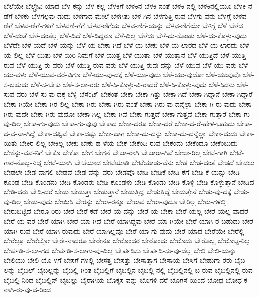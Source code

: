 {ಬೆಲೆಯೇ
ಬೆಲ್ಗ್ರೇವಿ-ಯಾದ
ಬೆಳ-ಕನ್ನು
ಬೆಳ-ಕಲ್ಲ
ಬೆಳಕಿಗೆ
ಬೆಳಕಿನ
ಬೆಳಕಿ-ನಂತೆ
ಬೆಳಕಿ-ನಲ್ಲಿ
ಬೆಳಕಿನಲ್ಲಿಯೂ
ಬೆಳಕಿ-ನೆ-ಡೆಗೆ
ಬೆಳಕು
ಬೆಳಗಲ್ಪವು-ಡುದು
ಬೆಳಗಾದ-ಮೇಲೆ
ಬೆಳಗಿತು
ಬೆಳ-ಗಿನ
ಬೆಳಗುತ್ತಿ-ರುವ
ಬೆಳಗು-ವನು
ಬೆಳಗ್ಗೆ
ಬೆಳವ-ಣಿಗೆ
ಬೆಳವ-ಣಿಗೆ-ಗಳಿಗೆ
ಬೆಳವಣಿ-ಗೆಗೆ
ಬೆಳವ-ಣಿಗೆಯ
ಬೆಳವ-ಣಿಗೆ-ಯನ್ನು
ಬೆಳವ-ಣಿಗೆಯೇ
ಬೆಳಿಗ್ಗೆ
ಬೆಳೆ
ಬೆಳೆದ
ಬೆಳೆ-ದಂತೆ
ಬೆಳೆ-ದಂತೆಲ್ಲ
ಬೆಳೆ-ದಿದೆ
ಬೆಳೆ-ದಿದ್ದರೂ
ಬೆಳೆ-ದಿಲ್ಲ
ಬೆಳೆದು
ಬೆಳೆ-ದು-ಕೊಂಡು
ಬೆಳೆ-ದು-ಕೊಳ್ಳು-ವುದು
ಬೆಳೆದೇ
ಬೆಳೆ-ಯದೆ
ಬೆಳೆ-ಯನ್ನು
ಬೆಳೆ-ಯ-ಬೇಕಾ-ಗಿದೆ
ಬೆಳೆ-ಯ-ಬೇಕು
ಬೆಳೆ-ಯ-ಲಾರದ
ಬೆಳೆ-ಯ-ಲಾರದು
ಬೆಳೆ-ಯ-ಲಿಲ್ಲ
ಬೆಳೆ-ಯಿತು
ಬೆಳೆ-ಯಿರಿ-ನಿಮಗೆ
ಬೆಳೆ-ಯುತ್ತ
ಬೆಳೆ-ಯುತ್ತಾ
ಬೆಳೆ-ಯುತ್ತಾನೆ
ಬೆಳೆ-ಯುತ್ತಿದೆ
ಬೆಳೆ-ಯುತ್ತಿ-ರುವ
ಬೆಳೆ-ಯುತ್ತಿ-ರು-ವರು
ಬೆಳೆ-ಯುತ್ತಿ-ರುವ-ವರು
ಬೆಳೆ-ಯುತ್ತಿ-ರುವು-ದನ್ನು
ಬೆಳೆ-ಯುವ
ಬೆಳೆ-ಯು-ವರು
ಬೆಳೆ-ಯು-ವಳು
ಬೆಳೆ-ಯುವ-ವರೆ-ವಿಗೂ
ಬೆಳೆ-ಯು-ವು-ದಕ್ಕೆ
ಬೆಳೆ-ಯು-ವುದು
ಬೆಳೆ-ಯು-ವುದೋ
ಬೆಳೆ-ಯುವುವೊ
ಬೆಳೆ-ಸ-ಬಹುದು
ಬೆಳೆ-ಸ-ಬೇಕು
ಬೆಳೆ-ಸ-ಲಾ-ರರು
ಬೆಳೆ-ಸಿ-ಕೊಳ್ಳು-ವಿ-ರಾದರೆ
ಬೆಳೆ-ಸಿ-ಕೊಳ್ಳು-ವುದು
ಬೆಳೆ-ಸಿದನು
ಬೆಳೆ-ಸುವ-ವರು
ಬೆಳೆ-ಸು-ವು-ದಕ್ಕೆ
ಬೆಳ್ಳಿ
ಬೆಸೆಂಟ್
ಬೇಕಂತೆ
ಬೇಕಾ
ಬೇಕಾ-ಗಿತ್ತು
ಬೇಕಾ-ಗಿದೆ
ಬೇಕಾ-ಗಿದ್ದಾನೆ
ಬೇಕಾ-ಗಿದ್ದಾರೆ
ಬೇಕಾ-ಗಿಯೇ
ಬೇಕಾ-ಗಿರ-ಲಿಲ್ಲ
ಬೇಕಾ-ಗಿರು
ಬೇಕಾ-ಗಿರು-ವಂತೆ
ಬೇಕಾ-ಗಿರು-ವು-ದನ್ನೆಲ್ಲಾ
ಬೇಕಾ-ಗಿ-ರು-ವುದು
ಬೇಕಾ-ಗಿರು-ವುದೇ
ಬೇಕಾ-ಗಿರು-ವುದೋ
ಬೇಕಾ-ಗಿಲ್ಲ
ಬೇಕಾ-ಗಿವೆ
ಬೇಕಾ-ಗುತ್ತದೆ
ಬೇಕಾ-ಗುತ್ತವೆ
ಬೇಕಾ-ಗುತ್ತಾರೆ
ಬೇಕಾ-ಗು-ವು-ದಿಲ್ಲ
ಬೇಕಾ-ಗು-ವುದು
ಬೇಕಾ-ಗು-ವುವು
ಬೇಕಾದ
ಬೇಕಾ-ದರೂ
ಬೇಕಾ-ದರೆ
ಬೇಕಾ-ದ-ರೆ-ಹೇಳ-ಬಹುದು
ಬೇಕಾ-ದ-ವ-ನಾ-ಗಿದ್ದೆ
ಬೇಕಾ-ದಷ್ಟಿವೆ
ಬೇಕಾ-ದಷ್ಟು
ಬೇಕಾ-ದಾಗ
ಬೇಕಾ-ದು-ದನ್ನು
ಬೇಕಾ-ದು-ದನ್ನೆಲ್ಲಾ
ಬೇಕಾ-ದುದು
ಬೇಕಾ-ಯಿತು
ಬೇಕಿರ-ಲಿಲ್ಲ
ಬೇಕಿಲ್ಲ
ಬೇಕು
ಬೇಕು-ಹ-ಳೆಯ
ಬೇಕೆ
ಬೇಕೆಂದಿ-ರುವ
ಬೇಕೆಂದು
ಬೇಕೆಂದೂ
ಬೇಕೆಂಬುದು
ಬೇಕೆನ್ನು-ವವ-ನಿಗೆ
ಬೇಕೊ
ಬೇಕೋ
ಬೇಗ
ಬೇಗನೆ
ಬೇಜಾ-ರಾಗಿ
ಬೇಜಾರಾ-ಗಿವೆ
ಬೇಜಾ-ರಿಲ್ಲ
ಬೇಟೆ-ಗಾಗಿ
ಬೇಟೆ-ಗಾರ-ನೊಬ್ಬ-ನಿದ್ದ
ಬೇಟೆ-ಯಾಗಿ
ಬೇಟೆಯಾಡ
ಬೇಟೆಯಾಡಿ
ಬೇಟೆಯಾಡು-ವೆನು
ಬೇಡ
ಬೇಡ-ದಂತೆ
ಬೇಡದೆ
ಬೇಡಲು
ಬೇಡಲೇ
ಬೇಡ-ವಾಗಲಿ
ಬೇಡವೆ
ಬೇಡ-ವೆನ್ನು-ವರು
ಬೇಡವೊ
ಬೇಡಿ
ಬೇಡಿಕೆ
ಬೇಡಿ-ಕೆಗೆ
ಬೇಡಿ-ಕೆ-ಯನ್ನು
ಬೇಡಿ-ಕೊಂಡ
ಬೇಡಿ-ಕೊಂಡನು
ಬೇಡಿ-ಕೊಂಡರು
ಬೇಡಿ-ಕೊಂಡಳು
ಬೇಡಿ-ಕೊಂಡು
ಬೇಡಿ-ಕೊಳ್ಳಿ
ಬೇಡಿ-ಕೊಳ್ಳುತ್ತಾನೆ
ಬೇಡಿದ
ಬೇಡಿ-ದರು
ಬೇಡಿ-ದರೆ
ಬೇಡು
ಬೇಡುತ್ತಾ
ಬೇಡುತ್ತಾನೆ
ಬೇಡುತ್ತಿದ್ದ
ಬೇಡುತ್ತಿದ್ದೆ
ಬೇಡುತ್ತೇನೆ
ಬೇಡು-ವು-ದಕ್ಕೆ
ಬೇಡು-ವು-ದಿಲ್ಲ
ಬೇಡು-ವುದು
ಬೇಯಿಸಿ
ಬೇರನ್ನು
ಬೇರಾ-ರನ್ನೂ
ಬೇರಾವ
ಬೇರಾ-ವುದೂ
ಬೇರಿಲ್ಲ
ಬೇರು-ಗಳಲ್ಲಿ
ಬೇರುಬಿಟ್ಟಿದೆ
ಬೇರೂ-ರಿರು
ಬೇರೆ
ಬೇರೆ-ಕಡೆ
ಬೇರೆ-ಯ-ದನ್ನು
ಬೇರೆ-ಯ-ಬೇಕಾ
ಬೇರೆ-ಯಲ್ಲ
ಬೇರೆ-ಯಲ್ಲ-ವಾದರೆ
ಬೇರೆ-ಯ-ವರ
ಬೇರೆ-ಯಾಗಿ
ಬೇರೆ-ಯಾ-ಗಿದೆ
ಬೇರೆ-ಯಾಗಿದ್ದವು
ಬೇರೆ-ಯಾ-ಗಿಯೇ
ಬೇರೆ-ಯಾಗಿ-ರ-ಬಹುದು
ಬೇರೆ-ಯಾಗಿ-ರುವ
ಬೇರೆ-ಯಾಗಿ-ರುವುದು
ಬೇರೆ-ಯಾಗಿಲ್ಲವೊ
ಬೇರೆ-ಯಾ-ಗು-ವುದು
ಬೇರೆ-ಯಾದ
ಬೇರೆಯೇ
ಬೇರೆಲ್ಲಿ
ಬೇರೆಲ್ಲೂ
ಬೇರೆಲ್ಲೋ
ಬೇರೇ-ನಾದರೂ
ಬೇರೇನೂ
ಬೇರೊಂದರ
ಬೇರೊಂದು
ಬೇರೊದು
ಬೇರೊಬ್ಬ
ಬೇರೊಬ್ಬ-ರಿಲ್ಲ
ಬೇರ್ಪಡಿ-ಸ-ಲಾ-ಗದ
ಬೇರ್ಪಡಿ-ಸ-ಲಾಗು-ವು-ದಿಲ್ಲ
ಬೇರ್ಪಡಿಸು
ಬೇರ್ಪಡಿ-ಸು-ವು-ದೆಲ್ಲ
ಬೇಲಿ
ಬೇಲಿ-ಯನ್ನು
ಬೇಲಿಯು
ಬೇಲಿ-ಯೊ-ಳಗೆ
ಬೇಸಗೆ-ಗಳಲ್ಲಿ
ಬೇಸತ್ತ
ಬೇಸತ್ತು
ಬೇಸಾತ್ತಾಗ
ಬೇಸಾಯ
ಬೇಸಿಗೆ
ಬೇಹುಗಾ-ರರು
ಬೈಬ-ಲನ್ನು
ಬೈಬಲ್
ಬೈಬಲ್ಲನ್ನು
ಬೈಬಲ್ಲಿ-ಗಿಂತ
ಬೈಬಲ್ಲಿಗೆ
ಬೈಬಲ್ಲಿನ
ಬೈಬಲ್ಲಿ-ನಲ್ಲಿ
ಬೈಬಲ್ಲಿನಲ್ಲಿ-ಬ-ರುವ
ಬೈಬಲ್ಲಿನಲ್ಲಿ-ರುವ
ಬೈಬಲ್ಲಿ-ನಿಂದ
ಬೈಬಲ್ಲಿನ್
ಬೈಬಲ್ಲು
ಬೈರಾಗಿಯ
ಬೊಕ್ಕಸ-ವನ್ನು
ಬೊಗಳಿ-ದರೆ
ಬೊಗಸೆ-ಯಿಂದ
ಬೋಧ
ಬೋಧ-ಕ-ನಾಗಿ-ರು-ವು-ದ-ರಿಂದ
}
